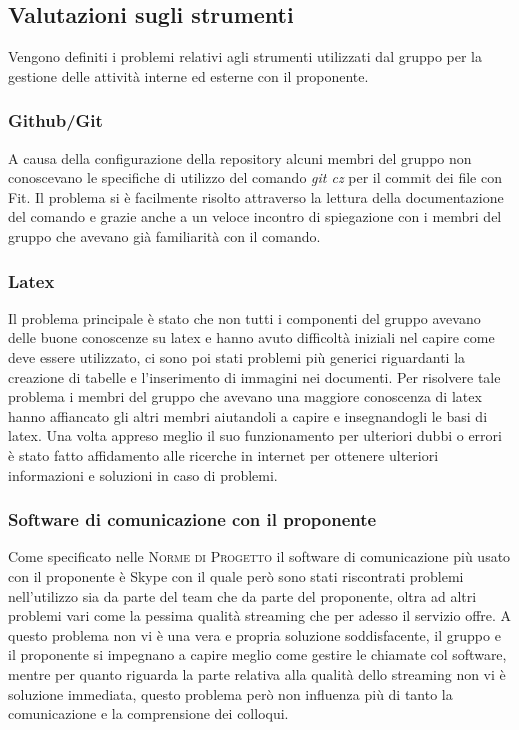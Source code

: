 \documentclass[../piano-di-qualifica.tex]{subfiles}
\begin{document}
\subsection{Valutazioni sugli strumenti}
\label{sub:valutazioni_strumenti}
Vengono definiti i problemi relativi agli strumenti utilizzati dal gruppo per la gestione delle attività interne ed esterne con il proponente.

\subsubsection{Github/Git}
\label{sub:github}
A causa della configurazione della repository alcuni membri del gruppo non conoscevano le specifiche di utilizzo del comando \textit{git cz} per il commit dei file con Fit. Il problema si è facilmente risolto attraverso la lettura della documentazione del comando e grazie anche a un veloce incontro di spiegazione con i membri del gruppo che avevano già familiarità con il comando.

\subsubsection{Latex}
\label{sub:latex}
Il problema principale è stato che non tutti i componenti del gruppo avevano delle buone conoscenze su latex e hanno avuto difficoltà iniziali nel capire come deve essere utilizzato, ci sono poi stati problemi più generici riguardanti la creazione di tabelle e l'inserimento di immagini nei documenti.
Per risolvere tale problema i membri del gruppo che avevano una maggiore conoscenza di latex hanno affiancato gli altri membri aiutandoli a capire e insegnandogli le basi di latex. Una volta appreso meglio il suo funzionamento per ulteriori dubbi o errori è stato fatto affidamento alle ricerche in internet per ottenere ulteriori informazioni e soluzioni in caso di problemi.

\subsubsection{Software di comunicazione con il proponente}
\label{sub:latex}
Come specificato nelle \textsc{Norme di Progetto} il software di comunicazione più usato con il proponente è Skype con il quale però sono stati riscontrati problemi nell'utilizzo sia da parte del team che da parte del proponente, oltra ad altri problemi vari come la pessima qualità streaming che per adesso il servizio offre.
A questo problema non vi è una vera e propria soluzione soddisfacente, il gruppo e il proponente si impegnano a capire meglio come gestire le chiamate col software, mentre per quanto riguarda la parte relativa alla qualità dello streaming non vi è soluzione immediata, questo problema però non influenza più di tanto la comunicazione e la comprensione dei colloqui.
\end{document}
